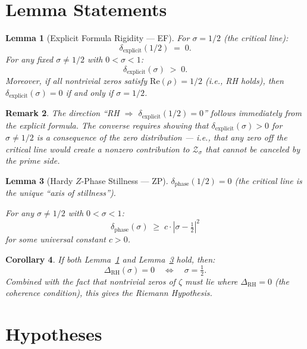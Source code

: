\documentclass[11pt]{article}
\newtheorem{lemma}{Lemma}
\newtheorem{corollary}[lemma]{Corollary}
\newtheorem{remark}[lemma]{Remark}
\theoremstyle{definition}
\begin{document}
\section{Lemma Statements}

\begin{lemma}[Explicit Formula Rigidity --- EF]
\label{lem:EF}
For $\sigma = 1/2$ (the critical line):
\[
  \delta_{\mathrm{explicit}}(1/2) \;=\; 0.
\]
For any fixed $\sigma \neq 1/2$ with $0 < \sigma < 1$:
\[
  \delta_{\mathrm{explicit}}(\sigma) \;>\; 0.
\]
Moreover, if all nontrivial zeros satisfy $\mathrm{Re}(\rho) = 1/2$
(i.e., RH holds), then $\delta_{\mathrm{explicit}}(\sigma) = 0$
if and only if $\sigma = 1/2$.
\end{lemma}

\begin{remark}
The direction ``RH $\Rightarrow$ $\delta_{\mathrm{explicit}}(1/2) = 0$'' follows
immediately from the explicit formula.  The converse requires showing that
$\delta_{\mathrm{explicit}}(\sigma) > 0$ for $\sigma \neq 1/2$ is a consequence
of the zero distribution --- i.e., that any zero off the critical line would
create a nonzero contribution to $\mathcal{Z}_\sigma$ that cannot be canceled
by the prime side.
\end{remark}

\begin{lemma}[Hardy $Z$-Phase Stillness --- ZP]
\label{lem:ZP}
$\delta_{\mathrm{phase}}(1/2) = 0$ (the critical line is the unique ``axis of stillness'').

For any $\sigma \neq 1/2$ with $0 < \sigma < 1$:
\[
  \delta_{\mathrm{phase}}(\sigma) \;\geq\; c \cdot |\sigma - \tfrac{1}{2}|^2
\]
for some universal constant $c > 0$.
\end{lemma}

\begin{corollary}
\label{cor:RH}
If both Lemma~\ref{lem:EF} and Lemma~\ref{lem:ZP} hold, then:
\[
  \Delta_{\mathrm{RH}}(\sigma) = 0 \quad \Longleftrightarrow \quad \sigma = \tfrac{1}{2}.
\]
Combined with the fact that nontrivial zeros of $\zeta$ must lie where
$\Delta_{\mathrm{RH}} = 0$ (the coherence condition), this gives the
Riemann Hypothesis.
\end{corollary}

\section{Hypotheses}
\end{document}

